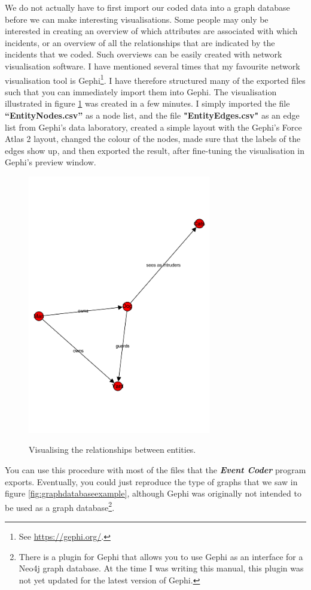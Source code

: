 \documentclass{memoir}
\begin{document}
We do not actually have to first import our coded data into a graph database before we can make interesting visualisations. Some people may only be interested in creating an overview of which attributes are associated with which incidents, or an overview of all the relationships that are indicated by the incidents that we coded. Such overviews can be easily created with network visualisation software. I have mentioned several times that my favourite network visualisation tool is Gephi\footnote{See \url{https://gephi.org/}.}. I have therefore structured many of the exported files such that you can immediately import them into Gephi. The visualisation illustrated in figure \ref{fig:network} was created in a few minutes. I simply imported the file \textbf{``Entity\textunderscore Nodes.csv''} as a node list, and the file \textbf{"Entity\textunderscore Edges.csv"} as an edge list from Gephi's data laboratory, created a simple layout with the Gephi's Force Atlas 2 layout, changed the colour of the nodes, made sure that the labels of the edges show up, and then exported the result, after fine-tuning the visualisation in Gephi's preview window. 

\begin{figure}[h!]
  \centering
  \caption{Visualising the relationships between entities.}
  \includegraphics[width=80mm]{Diagram_5.pdf}
  \label{fig:network}
\end{figure}

You can use this procedure with most of the files that the \textbf{\emph{Event Coder}} program exports. Eventually, you could just reproduce the type of graphs that we saw in figure \ref{fig:graphdatabaseexample}, although Gephi was originally not intended to be used as a graph database\footnote{There is a plugin for Gephi that allows you to use Gephi as an interface for a Neo4j graph database. At the time I was writing this manual, this plugin was not yet updated for the latest version of Gephi.}.
\end{document}
